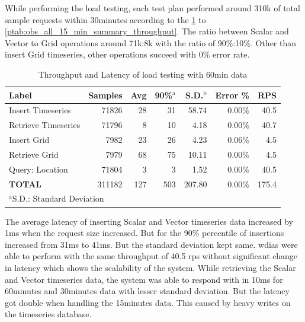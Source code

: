\documentclass[conference]{IEEEtran}
\begin{document}
While performing the load testing, each test plan performed around 310k of total sample requests within 30minutes according to the \cref{ptab:obs_all_60_min_summary_throughput} to \cref{ptab:obs_all_15_min_summary_throughput}. The ratio between Scalar and Vector to Grid operations around 71k:8k with the ratio of 90\%:10\%.
Other than insert Grid timeseries, other operations succeed with 0\% error rate.

\begin{table}[tb!]
\centering
\caption{Throughput and Latency of load testing with 60min data}
\begin{adjustbox}{width=0.45\textwidth}
\begin{tabular}{|l|r|r|r|r|r|r|}
\hline
\textbf{Label} & \textbf{Samples} & \textbf{Avg} & \textbf{90\%$^{\mathrm{a}}$} & \textbf{S.D.$^{\mathrm{b}}$} & \textbf{Error \%} & \textbf{RPS} \\ \hline
Insert Timeseries & 71826 & 28 & 31 & 58.74 & 0.00\% & 40.5 \\ \hline
Retrieve Timeseries & 71796 & 8 & 10 & 4.18 & 0.00\% & 40.7 \\ \hline
Insert Grid & 7982 & 23 & 26 & 4.23 & 0.06\% & 4.5 \\ \hline
Retrieve Grid & 7979 & 68 & 75 & 10.11 & 0.00\% & 4.5 \\ \hline
Query: Location & 71804 & 3 & 3 & 1.52 & 0.00\% & 40.5 \\ \hline
\textbf{TOTAL} & 311182 & 127 & 503 & 207.80 & 0.00\% & 175.4 \\ \hline
\multicolumn{4}{l}{$^{\mathrm{a}}$S.D.: Standard Deviation}{$^{\mathrm{b}}$90\%: 90\% percentile}
\end{tabular}
\end{adjustbox}
\label{ptab:obs_all_60_min_summary_throughput}
\end{table}

The average latency of inserting Scalar and Vector timeseries data increased by 1ms when the request size increased. But for the 90\% percentile of insertions increased from 31ms to 41ms. But the standard deviation kept same. \acrshort{wdias} were able to perform with the same throughput of 40.5 \acrshort{rps} without significant change in latency which shows the scalability of the system.
While retrieving the Scalar and Vector timeseries data, the system was able to respond with in 10ms for 60minutes and 30minutes data with lesser standard deviation. But the latency got double when handling the 15minutes data. This caused by heavy writes on the timeseries database.
\end{document}
